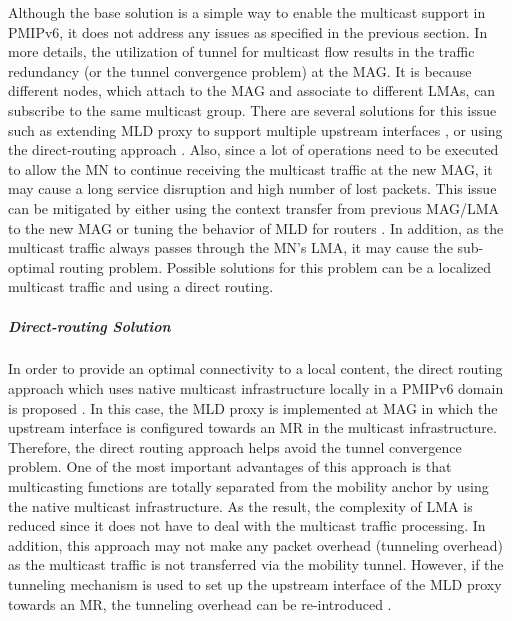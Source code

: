 Although the base solution is a simple way to enable the multicast support in PMIPv6, it does not address any issues as specified in the previous section. In more details, the utilization of tunnel for multicast flow results in the traffic redundancy (or the tunnel convergence problem) at the MAG. It is because different nodes, which attach to the MAG and associate to different LMAs, can subscribe to the same multicast group. There are several solutions for this issue such as extending MLD proxy to support multiple upstream interfaces \cite{multi_upstream_interface}, or using the direct-routing approach \cite{direct_routing_mtma}. Also, since a lot of operations need to be executed to allow the MN to continue receiving the multicast traffic at the new MAG, it may cause a long service disruption and high number of lost packets. This issue can be mitigated by either using the context transfer from previous MAG/LMA to the new MAG \cite{d4.2,SIAL} or tuning the behavior of MLD for routers \cite{tuning_MLD}. In addition, as the multicast traffic always passes through the MN's LMA, it may cause the sub-optimal routing problem. Possible solutions for this problem can be a localized multicast traffic and using a direct routing. 

\subparagraph{Direct-routing Solution} 
In order to provide an optimal connectivity to a local content, the direct routing approach which uses native multicast infrastructure locally in a PMIPv6 domain is proposed \cite{direct_routing_mtma}. In this case, the MLD proxy is implemented at MAG in which the upstream interface is configured towards an MR in the multicast infrastructure. Therefore, the direct routing approach helps avoid the tunnel convergence problem. One of the most important advantages of this approach is that multicasting functions are totally separated from the mobility anchor by using the native multicast infrastructure. As the result, the complexity of LMA is reduced since it does not have to deal with the multicast traffic processing. In addition, this approach may not make any packet overhead (tunneling overhead) as the multicast traffic is not transferred via the mobility tunnel. However, if the tunneling mechanism is used to set up the upstream interface of the MLD proxy towards an MR, the tunneling overhead can be re-introduced \cite{direct_routing_mtma}. 

